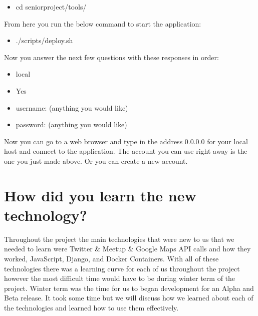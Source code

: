\documentclass[draftclsnofoot,10pt,onecolumn]{IEEEtran} %
\begin{document}
\begin{enumerate}
	\begin{itemize}
		\item cd seniorproject/tools/ \\
	\end{itemize}
	
	From here you run the below command to start the application:
	
	\begin{itemize}
		\item ./scripts/deploy.sh \\
	\end{itemize}
	
	Now you answer the next few questions with these responses in order:
	
	\begin{itemize}
		\item local
		\item Yes
		\item username: (anything you would like)
		\item password: (anything you would like) \\
	\end{itemize}
	
	Now you can go to a web browser and type in the address 0.0.0.0 for your local host and connect to the application. 
	The account you can use right away is the one you just made above. Or you can create a new account. \\
	
	
\end{enumerate}

\section{How did you learn the new technology?}

Throughout the project the main technologies that were new to us that we needed to learn were Twitter \& Meetup \& Google Maps API
calls and how they worked, JavaScript, Django, and Docker Containers. With all of these technologies there was a learning curve 
for each of us throughout the project however the most difficult time would have to be during winter term of the project. Winter 
term was the time for us to began development for an Alpha and Beta release. It took some time but we will discuss how we 
learned about each of the technologies and learned how to use them effectively. \\
\end{document}
